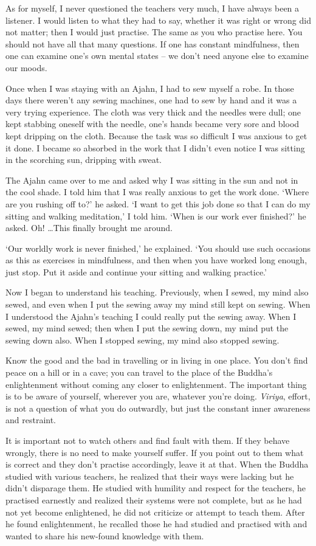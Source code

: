 As for myself, I never questioned the teachers very much, I have always
been a listener. I would listen to what they had to say, whether it was
right or wrong did not matter; then I would just practise. The same as
you who practise here. You should not have all that many questions. If
one has constant mindfulness, then one can examine one's own mental
states -- we don't need anyone else to examine our moods.

Once when I was staying with an Ajahn, I had to sew myself a robe. In
those days there weren't any sewing machines, one had to sew by hand and
it was a very trying experience. The cloth was very thick and the
needles were dull; one kept stabbing oneself with the needle, one's
hands became very sore and blood kept dripping on the cloth. Because the
task was so difficult I was anxious to get it done. I became so absorbed
in the work that I didn't even notice I was sitting in the scorching
sun, dripping with sweat.

The Ajahn came over to me and asked why I was sitting in the sun and not
in the cool shade. I told him that I was really anxious to get the work
done. `Where are you rushing off to?' he asked. `I want to get this job
done so that I can do my sitting and walking meditation,' I told him.
`When is our work ever finished?' he asked. Oh! \ldots{}This finally
brought me around.

`Our worldly work is never finished,' he explained. `You should use such
occasions as this as exercises in mindfulness, and then when you have
worked long enough, just stop. Put it aside and continue your sitting
and walking practice.'

Now I began to understand his teaching. Previously, when I sewed, my
mind also sewed, and even when I put the sewing away my mind still kept
on sewing. When I understood the Ajahn's teaching I could really put the
sewing away. When I sewed, my mind sewed; then when I put the sewing
down, my mind put the sewing down also. When I stopped sewing, my mind
also stopped sewing.

Know the good and the bad in travelling or in living in one place. You
don't find peace on a hill or in a cave; you can travel to the place of
the Buddha's enlightenment without coming any closer to enlightenment. 
The important thing is to be aware of yourself, wherever you are, 
whatever you're doing. \emph{Viriya}, effort, is not a question of what
you do outwardly, but just the constant inner awareness and restraint. 

It is important not to watch others and find fault with them. If they
behave wrongly, there is no need to make yourself suffer. If you point
out to them what is correct and they don't practise accordingly, leave
it at that. When the Buddha studied with various teachers, he realized
that their ways were lacking but he didn't disparage them. He studied
with humility and respect for the teachers, he practised earnestly and
realized their systems were not complete, but as he had not yet become
enlightened, he did not criticize or attempt to teach them. After he
found enlightenment, he recalled those he had studied and practised with
and wanted to share his new-found knowledge with them. 

